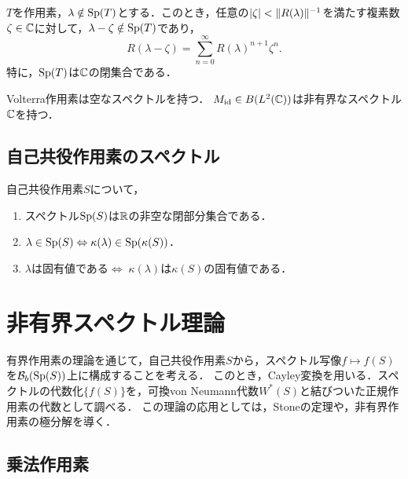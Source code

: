 \documentclass[uplatex,dvipdfmx]{jsreport}
\begin{document}
\begin{proposition}
    $T$を作用素，$\lambda\notin\mathrm{Sp}(T)$とする．このとき，任意の$\lvert\zeta\rvert<\|R(\lambda)\|^{-1}$を満たす複素数$\zeta\in\mathbb{C}$に対して，$\lambda-\zeta\notin\mathrm{Sp}(T)$であり，
    \[R(\lambda-\zeta)=\sum^\infty_{n=0}R(\lambda)^{n+1}\zeta^n.\]
    特に，$\mathrm{Sp}(T)$は$\mathbb{C}$の閉集合である．
\end{proposition}

\begin{example}
    Volterra作用素は空なスペクトルを持つ．
    $M_{\mathrm{id}}\in B(L^2(\mathbb{C}))$は非有界なスペクトル$\mathbb{C}$を持つ．
\end{example}

\subsection{自己共役作用素のスペクトル}

\begin{proposition}
    自己共役作用素$S$について，
    \begin{enumerate}
        \item スペクトル$\mathrm{Sp}(S)$は$\mathbb{R}$の非空な閉部分集合である．
        \item $\lambda\in\mathrm{Sp}(S)\Leftrightarrow\kappa(\lambda)\in\mathrm{Sp}(\kappa(S))$．
        \item $\lambda$は固有値である$\Leftrightarrow\;\kappa(\lambda)$は$\kappa(S)$の固有値である．
    \end{enumerate}
\end{proposition}

\section{非有界スペクトル理論}

\begin{tcolorbox}[colframe=ForestGreen, colback=ForestGreen!10!white,breakable,colbacktitle=ForestGreen!40!white,coltitle=black,fonttitle=\bfseries\sffamily,
title=]
    有界作用素の理論を通じて，自己共役作用素$S$から，スペクトル写像$f\mapsto f(S)$を$\mathcal{B}_b(\mathrm{Sp}(S))$上に構成することを考える．
    このとき，Cayley変換を用いる．スペクトルの代数化$\{f(S)\}$を，可換von Neumann代数$W^*(S)$と結びついた正規作用素の代数として調べる．
    この理論の応用としては，Stoneの定理や，非有界作用素の極分解を導く．
\end{tcolorbox}

\subsection{乗法作用素}
\end{document}
